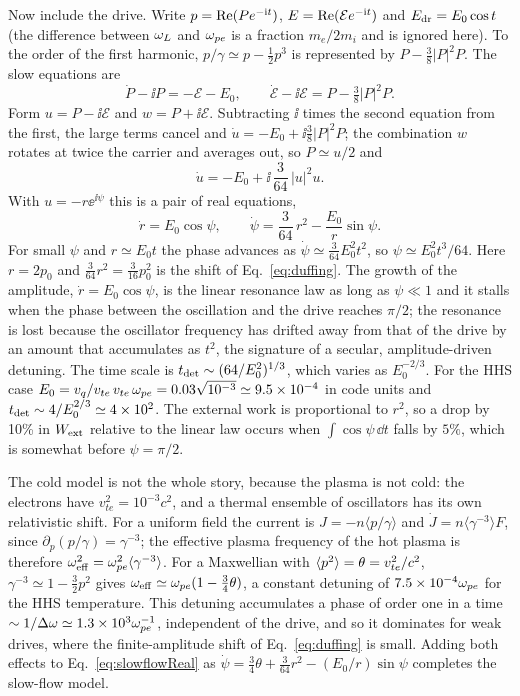Now include the drive. Write $p=\operatorname{Re}(Pe^{-\mathrm{i} t})$, $E=\operatorname{Re}(\mathcal Ee^{-\mathrm{i} t})$ and $E_{\rm dr}=E_0\cos t$ (the difference between $\omega_L$ and $\omega_{pe}$ is a fraction $m_e/2m_i$ and is ignored here). To the order of the first harmonic, $p/\gamma\simeq p-\tfrac12p^3$ is represented by $P-\tfrac38|P|^2P$. The slow equations are
\begin{equation}
\dot P-\ii P=-\mathcal E-E_0 ,\qquad \dot{\mathcal E}-\ii\mathcal E=P-\tfrac38|P|^2P .
\end{equation}
Form $u=P-\ii\mathcal E$ and $w=P+\ii\mathcal E$. Subtracting $\ii$ times the second equation from the first, the large terms cancel and $\dot u=-E_0+\ii\tfrac38|P|^2P$; the combination $w$ rotates at twice the carrier and averages out, so $P\simeq u/2$ and
\begin{equation}
\dot u=-E_0+\ii\,\frac{3}{64}\,|u|^2u .\label{eq:slowflow}
\end{equation}
With $u=-r\ee^{\ii\psi}$ this is a pair of real equations,
\begin{equation}
\dot r=E_0\cos\psi ,\qquad \dot\psi=\frac{3}{64}\,r^2-\frac{E_0}{r}\sin\psi .\label{eq:slowflowReal}
\end{equation}
For small $\psi$ and $r\simeq E_0t$ the phase advances as $\dot\psi\simeq\tfrac3{64}E_0^2t^2$, so $\psi\simeq E_0^2t^3/64$. Here $r=2p_0$ and $\tfrac3{64}r^2=\tfrac3{16}p_0^2$ is the shift of Eq.~\eqref{eq:duffing}. The growth of the amplitude, $\dot r=E_0\cos\psi$, is the linear resonance law as long as $\psi\ll1$ and it stalls when the phase between the oscillation and the drive reaches $\pi/2$; the resonance is lost because the oscillator frequency has drifted away from that of the drive by an amount that accumulates as $t^2$, the signature of a secular, amplitude-driven detuning. The time scale is $t_{\rm det}\sim(64/E_0^2)^{1/3}$, which varies as $E_0^{-2/3}$. For the HHS case $E_0=v_q/v_{te}\,v_{te}\,\omega_{pe}=0.03\sqrt{10^{-3}}\simeq9.5\times10^{-4}$ in code units and $t_{\rm det}\sim4/E_0^{2/3}\simeq4\times10^2$. The external work is proportional to $r^2$, so a drop by 10\% in $W_{\rm ext}$ relative to the linear law occurs when $\int\cos\psi\,\dd t$ falls by $5\%$, which is somewhat before $\psi=\pi/2$.

The cold model is not the whole story, because the plasma is not cold: the electrons have $v_{te}^2=10^{-3}c^2$, and a thermal ensemble of oscillators has its own relativistic shift. For a uniform field the current is $J=-n\langle p/\gamma\rangle$ and $\dot J=n\langle\gamma^{-3}\rangle F$, since $\partial_p(p/\gamma)=\gamma^{-3}$; the effective plasma frequency of the hot plasma is therefore $\omega_{\rm eff}^2=\omega_{pe}^2\langle\gamma^{-3}\rangle$. For a Maxwellian with $\langle p^2\rangle=\theta=v_{te}^2/c^2$, $\gamma^{-3}\simeq1-\tfrac32p^2$ gives $\omega_{\rm eff}\simeq\omega_{pe}(1-\tfrac34\theta)$, a constant detuning of $7.5\times10^{-4}\omega_{pe}$ for the HHS temperature. This detuning accumulates a phase of order one in a time $\sim1/\Delta\omega\simeq1.3\times10^3\omega_{pe}^{-1}$, independent of the drive, and so it dominates for weak drives, where the finite-amplitude shift of Eq.~\eqref{eq:duffing} is small. Adding both effects to Eq.~\eqref{eq:slowflowReal} as $\dot\psi=\tfrac34\theta+\tfrac3{64}r^2-(E_0/r)\sin\psi$ completes the slow-flow model.

